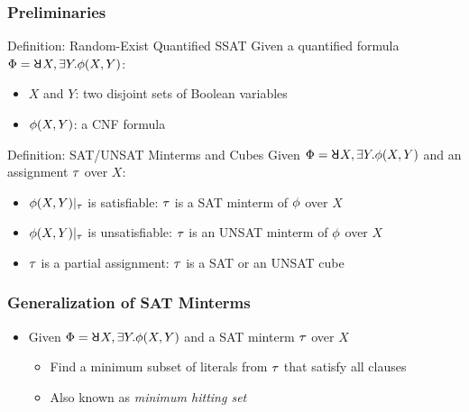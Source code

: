 \begin{frame}
    \frametitle{Preliminaries}
    \begin{block}{Definition: Random-Exist Quantified SSAT}
        Given a quantified formula $\Qf=\random{} X,\exists Y.\pf(X,Y)$:
        \begin{itemize}
            \item $X$ and $Y$: two disjoint sets of Boolean variables
            \item $\phi(X,Y)$: a CNF formula
        \end{itemize}
    \end{block}
    \pause
    \begin{block}{Definition: SAT/UNSAT Minterms and Cubes}
        Given $\Qf=\random{} X,\exists Y.\pf(X,Y)$ and an assignment $\tau$ over $X$:
        \begin{itemize}
            \item $\phi(X,Y)|_{\tau}$ is satisfiable: $\tau$ is a SAT minterm of $\phi$ over $X$
            \item $\phi(X,Y)|_{\tau}$ is unsatisfiable: $\tau$ is an UNSAT minterm of $\phi$ over $X$
            \item $\tau$ is a partial assignment: $\tau$ is a SAT or an UNSAT cube
        \end{itemize}
    \end{block}
\end{frame}

\begin{frame}
    \frametitle{Generalization of SAT Minterms}
    \begin{itemize}
        \item Given $\Qf=\random{} X,\exists Y.\pf(X,Y)$ and a SAT minterm $\tau$ over $X$
              \begin{itemize}
                  \item Find a minimum subset of literals from $\tau$ that satisfy all clauses
                  \item Also known as \textit{minimum hitting set}
              \end{itemize}
    \end{itemize}
\end{frame}

